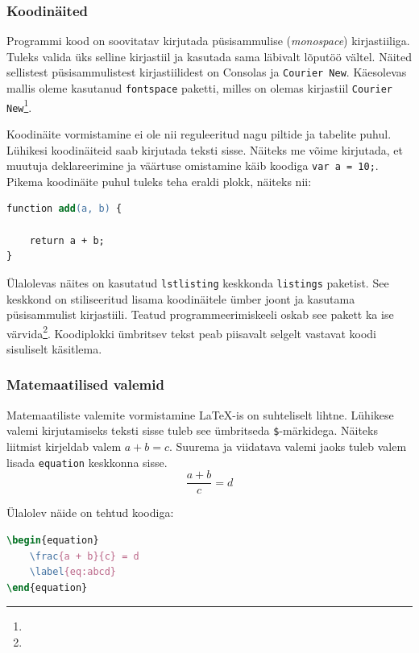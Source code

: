 \subsubsection{Koodinäited}
Programmi kood on soovitatav kirjutada püsisammulise (\emph{monospace}) kirjastiiliga. Tuleks valida üks selline kirjastiil ja kasutada sama läbivalt lõputöö vältel. Näited sellistest püsisammulistest kirjastiilidest on Consolas ja \texttt{Courier New}. Käesolevas mallis oleme kasutanud \verb|fontspace| paketti, milles on olemas kirjastiil \texttt{Courier New}\footnote{}.

Koodinäite vormistamine ei ole nii reguleeritud nagu piltide ja tabelite puhul. Lühikesi koodinäiteid saab kirjutada teksti sisse. Näiteks me võime kirjutada, et muutuja deklareerimine ja väärtuse omistamine käib koodiga \verb|var a = 10;|. Pikema koodinäite puhul tuleks teha eraldi plokk, näiteks nii: 

\begin{lstlisting}[language=PostScript]
function add(a, b) {

    return a + b;
}
\end{lstlisting}

Ülalolevas näites on kasutatud \verb|lstlisting| keskkonda \verb|listings| paketist. See keskkond on stiliseeritud lisama koodinäitele ümber joont ja kasutama püsisammulist kirjastiili. Teatud programmeerimiskeeli oskab see pakett ka ise värvida\footnote{}. Koodiplokki ümbritsev tekst peab piisavalt selgelt vastavat koodi sisuliselt käsitlema.

\subsubsection{Matemaatilised valemid}
Matemaatiliste valemite vormistamine LaTeX-is on suhteliselt lihtne. Lühikese valemi kirjutamiseks teksti sisse tuleb see ümbritseda \verb|$|-märkidega. Näiteks liitmist kirjeldab valem $a+b=c$. Suurema ja viidatava valemi jaoks tuleb valem lisada \verb|equation| keskkonna sisse. 
\begin{equation}
    \frac{a + b}{c} = d
    \label{eq:abcd}
\end{equation}

Ülalolev näide on tehtud koodiga:
\begin{lstlisting}[language=tex]
\begin{equation}
    \frac{a + b}{c} = d
    \label{eq:abcd}
\end{equation}
\end{lstlisting}

